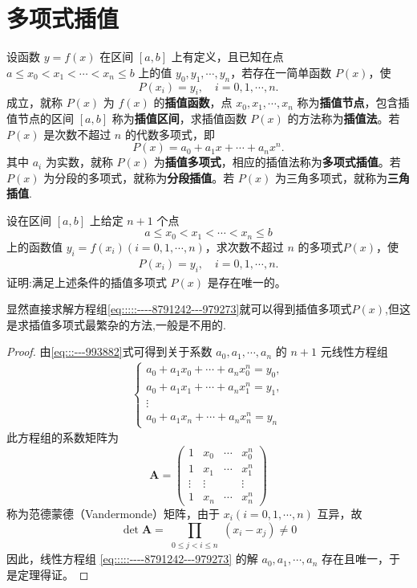 \documentclass[../../main.tex]{subfiles}
\begin{document}
\section{多项式插值}

\begin{definition}
设函数 $y = f(x)$ 在区间 $[a, b]$ 上有定义，且已知在点 $a \leqslant x_0 < x_1 < \cdots < x_n \leqslant b$ 上的值 $y_0, y_1, \cdots, y_n$，若存在一简单函数 $P(x)$，使 
\[
P(x_i) = y_i, \quad i = 0, 1, \cdots, n .
\]
成立，就称 $P(x)$ 为 $f(x)$ 的\textbf{插值函数}，点 $x_0, x_1, \cdots, x_n$ 称为\textbf{插值节点}，包含插值节点的区间 $[a, b]$ 称为\textbf{插值区间}，求插值函数 $P(x)$ 的方法称为\textbf{插值法}。若 $P(x)$ 是次数不超过 $n$ 的代数多项式，即 
\[
P(x) = a_0 + a_1 x + \cdots + a_n x^n .
\]
其中 $a_i$ 为实数，就称 $P(x)$ 为\textbf{插值多项式}，相应的插值法称为\textbf{多项式插值}。若 $P(x)$ 为分段的多项式，就称为\textbf{分段插值}。若 $P(x)$ 为三角多项式，就称为\textbf{三角插值}.
\end{definition}

\begin{theorem}
设在区间 $[a, b]$ 上给定 $n + 1$ 个点 
\[
a \leqslant x_0 < x_1 < \cdots < x_n \leqslant b
\]
上的函数值 $y_i = f(x_i) (i = 0, 1, \cdots, n)$，求次数不超过 $n$ 的多项式$P(x)$，使 
\begin{align}
P(x_i) = y_i, \quad i = 0, 1, \cdots, n.\label{eq:::---993882}
\end{align}
证明:满足上述条件的插值多项式 $P(x)$ 是存在唯一的。
\end{theorem}
\begin{remark}
显然直接求解方程组\eqref{eq:::::----8791242---979273}就可以得到插值多项式$P(x)$,但这是求插值多项式最繁杂的方法,一般是不用的.
\end{remark}
\begin{proof}
由\eqref{eq:::---993882}式可得到关于系数 $a_0, a_1, \cdots, a_n$ 的 $n + 1$ 元线性方程组
\begin{align}
\begin{cases} 
a_0 + a_1 x_0 + \cdots + a_n x_0^n = y_0, \\ 
a_0 + a_1 x_1 + \cdots + a_n x_1^n = y_1, \\ 
\vdots \\ 
a_0 + a_1 x_n + \cdots + a_n x_n^n = y_n 
\end{cases} \label{eq:::::----8791242---979273}
\end{align}
此方程组的系数矩阵为 
\[
\boldsymbol{A} = \begin{pmatrix} 
1 & x_0 & \cdots & x_0^n \\ 
1 & x_1 & \cdots & x_1^n \\ 
\vdots & \vdots & & \vdots \\ 
1 & x_n & \cdots & x_n^n 
\end{pmatrix}
\]
称为范德蒙德（Vandermonde）矩阵，由于 $x_i (i = 0, 1, \cdots, n)$ 互异，故 
\[
\det \boldsymbol{A} = \prod_{\substack{0 \leqslant j < i \leqslant n}} (x_i - x_j) \neq 0
\]
因此，线性方程组 \eqref{eq:::::----8791242---979273} 的解 $a_0, a_1, \cdots, a_n$ 存在且唯一，于是定理得证。
\end{proof}
\end{document}
